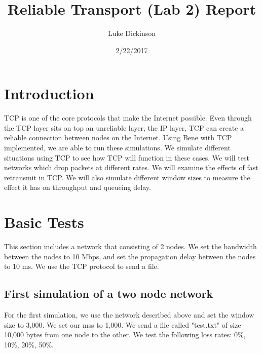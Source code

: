 \documentclass[fleqn,11pt]{article}
\begin{document}
\lstset{
  language=Python,
  basicstyle=\small,          %
  keywordstyle=\bfseries,
  identifierstyle=,           %
  commentstyle=,              %
  stringstyle=\ttfamily,      %
  showstringspaces=false,     %
  numbers=left,
  numberstyle=\tiny,
  numbersep=5pt,
  frame=tb,
}

\title{Reliable Transport (Lab 2) Report}

\author{Luke Dickinson}

\date{2/22/2017}

\maketitle

\section{Introduction}

TCP is one of the core protocols that make the Internet possible. Even through the TCP layer sits on top an unreliable layer, the IP layer, TCP can create a reliable connection between nodes on the Internet. Using Bene with TCP implemented, we are able to run these simulations. We simulate different situations using TCP to see how TCP will function in these cases. We will test networks which drop packets at different rates. We will examine the effects of fast retransmit in TCP. We will also simulate different window sizes to measure the effect it has on throughput and queueing delay. 

\section{Basic Tests}
This section includes a network that consisting of 2 nodes. We set the bandwidth between the nodes to 10 Mbps, and set the propagation delay between the nodes to 10 ms.  We use the TCP protocol to send a file.

 \subsection{First simulation of a two node network}
For the first simulation, we use the network described above and set the window size to 3,000. We set our mss to 1,000. We send a file called "test.txt" of size 10,000 bytes from one node to the other. We test the following loss rates: 0\%, 10\%, 20\%, 50\%.
\end{document}
